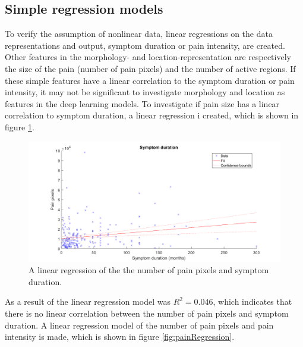 \subsection{Simple regression models}
To verify the assumption of nonlinear data, linear regressions on the data representations and output, symptom duration or pain intensity, are created. 
Other features in the morphology- and location-representation are respectively the size of the pain (number of pain pixels) and the number of active regions. If these simple features have a linear correlation to the symptom duration or pain intensity,  it may not be significant to investigate morphology and location as features in the deep learning models. \newline
\noindent
To investigate if pain size has a linear correlation to symptom duration, a linear regression i created, which is shown in figure \ref{fig:durationRegression}.
\newline

\begin{figure} [H]
\centering
\includegraphics[width=1\textwidth]{figures/durationRegression}
\caption{A linear regression of the the number of pain pixels and symptom duration.}
\label{fig:durationRegression}
\end{figure}

\noindent
As a result of the linear regression model was $R^2=0.046$, which indicates that there is no linear correlation between the number of pain pixels and symptom duration.\newline
\noindent
A linear regression model of the number of pain pixels and pain intensity is made, which is shown in figure \ref{fig:painRegression}. \newline

